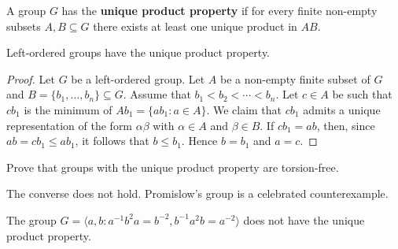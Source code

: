 \begin{definition}
	A group $G$ has the \textbf{unique product property} if 
	for every finite non-empty subsets $A,B\subseteq G$ there exists at least one
	unique product in $AB$.
\end{definition}

\begin{proposition}
    Left-ordered groups have the unique product property.
\end{proposition}

\begin{proof}
    Let $G$ be a left-ordered group. 
	Let $A$ be a non-empty finite subset of $G$ and $B=\{b_1,\dots,b_n\}\subseteq G$. 
	Assume that $b_1<b_2<\cdots<b_n$. Let $c\in A$ be such that $cb_1$ is the 
	minimum of $Ab_1=\{ab_1:a\in A\}$. We claim that $cb_1$ admits a unique
	representation of the form $\alpha\beta$ with $\alpha\in A$ and 
	$\beta\in B$. If $cb_1=ab$, then, since $ab=cb_1\leq ab_1$, it follows that 
	$b\leq b_1$. Hence $b=b_1$ and $a=c$. 
\end{proof}

\begin{exercise}
	Prove that groups with the unique product property are
	torsion-free.
\end{exercise}

The converse does not hold. 
Promislow's group is a celebrated counterexample.

\begin{theorem}[Promislow]
    The group $G=\langle a,b:a^{-1}b^2a=b^{-2},b^{-1}a^2b=a^{-2}\rangle$
    does not have the unique product property.
\end{theorem}

